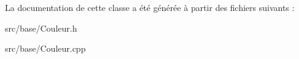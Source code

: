 La documentation de cette classe a été générée à partir des fichiers suivants \+:\begin{DoxyCompactItemize}
\item 
src/base/Couleur.\+h\item 
src/base/Couleur.\+cpp\end{DoxyCompactItemize}
